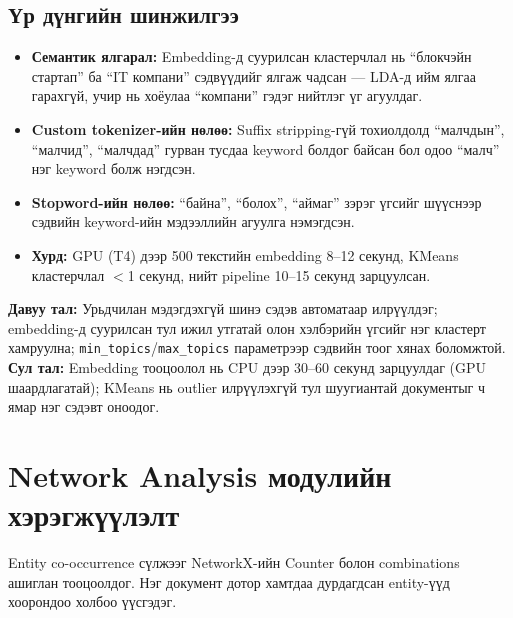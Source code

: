 \subsection{Үр дүнгийн шинжилгээ}

\begin{itemize}
    \item \textbf{Семантик ялгарал:} Embedding-д суурилсан кластерчлал нь ``блокчэйн стартап'' ба ``IT компани'' сэдвүүдийг ялгаж чадсан — LDA-д ийм ялгаа гарахгүй, учир нь хоёулаа ``компани'' гэдэг нийтлэг үг агуулдаг.
    \item \textbf{Custom tokenizer-ийн нөлөө:} Suffix stripping-гүй тохиолдолд ``малчдын'', ``малчид'', ``малчдад'' гурван тусдаа keyword болдог байсан бол одоо ``малч'' нэг keyword болж нэгдсэн.
    \item \textbf{Stopword-ийн нөлөө:} ``байна'', ``болох'', ``аймаг'' зэрэг үгсийг шүүснээр сэдвийн keyword-ийн мэдээллийн агуулга нэмэгдсэн.
    \item \textbf{Хурд:} GPU (T4) дээр 500 текстийн embedding 8--12 секунд, KMeans кластерчлал $<$1 секунд, нийт pipeline 10--15 секунд зарцуулсан.
\end{itemize}

\textbf{Давуу тал:} Урьдчилан мэдэгдэхгүй шинэ сэдэв автоматаар илрүүлдэг; embedding-д суурилсан тул ижил утгатай олон хэлбэрийн үгсийг нэг кластерт хамруулна; \texttt{min\_topics}/\texttt{max\_topics} параметрээр сэдвийн тоог хянах боломжтой. \textbf{Сул тал:} Embedding тооцоолол нь CPU дээр 30--60 секунд зарцуулдаг (GPU шаардлагатай); KMeans нь outlier илрүүлэхгүй тул шуугиантай документыг ч ямар нэг сэдэвт оноодог.

\section{Network Analysis модулийн хэрэгжүүлэлт}

Entity co-occurrence сүлжээг NetworkX-ийн Counter болон combinations ашиглан тооцоолдог. Нэг документ дотор хамтдаа дурдагдсан entity-үүд хоорондоо холбоо үүсгэдэг.

